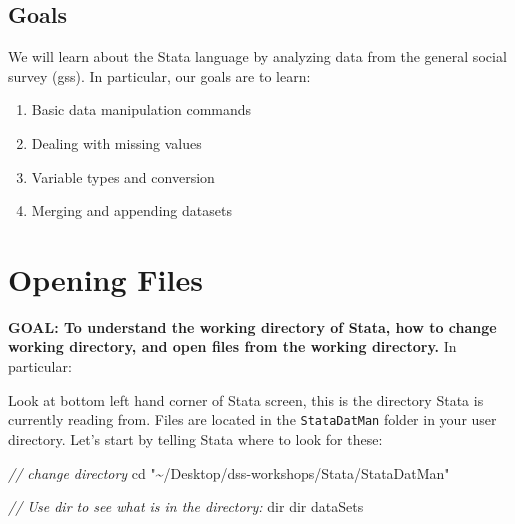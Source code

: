 \documentclass[
]{book}
\newenvironment{Shaded}{\begin{snugshade}}{\end{snugshade}}
\newcommand{\CommentTok}[1]{\textcolor[rgb]{0.56,0.35,0.01}{\textit{#1}}}
\newcommand{\NormalTok}[1]{#1}
\newcommand{\OtherTok}[1]{\textcolor[rgb]{0.56,0.35,0.01}{#1}}
\newcommand{\StringTok}[1]{\textcolor[rgb]{0.31,0.60,0.02}{#1}}
\providecommand{\tightlist}{%
  \setlength{\itemsep}{0pt}\setlength{\parskip}{0pt}}
\begin{document}
\hypertarget{goals-6}{%
\subsection{Goals}\label{goals-6}}

\begin{alert}

We will learn about the Stata language by analyzing data from the general social survey (gss). In particular, our goals are to learn:

\begin{enumerate}
\def\labelenumi{\arabic{enumi}.}
\tightlist
\item
  Basic data manipulation commands
\item
  Dealing with missing values
\item
  Variable types and conversion
\item
  Merging and appending datasets
\end{enumerate}

\end{alert}

\hypertarget{opening-files}{%
\section{Opening Files}\label{opening-files}}

\begin{alert}

\textbf{GOAL: To understand the working directory of Stata, how to change working directory, and open files from the working directory.} In particular:

\end{alert}

Look at bottom left hand corner of Stata screen, this is the directory Stata is currently reading from. Files are located in the \texttt{StataDatMan} folder in your user directory. Let's start by telling Stata where to look for these:

\begin{Shaded}
\begin{Highlighting}[]
\CommentTok{// change directory}
\NormalTok{cd }\StringTok{"\textasciitilde{}/Desktop/dss{-}workshops/Stata/StataDatMan"}

\CommentTok{// Use dir to see what is in the directory:}
\OtherTok{dir}
\OtherTok{dir}\NormalTok{ dataSets}
\end{Highlighting}
\end{Shaded}
\end{document}
